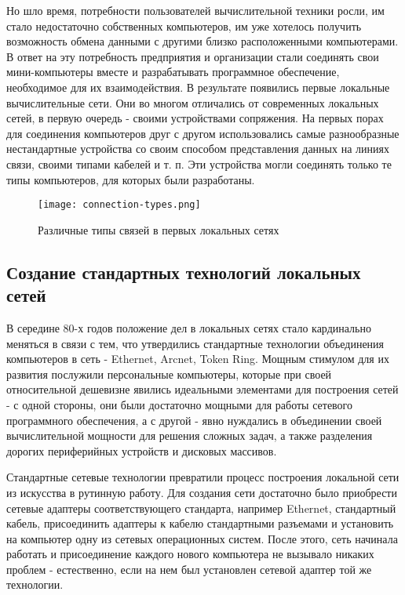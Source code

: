 Но шло время, потребности пользователей вычислительной техники росли, им стало недостаточно собственных компьютеров, им уже хотелось получить возможность обмена данными с другими близко расположенными компьютерами.
В ответ на эту потребность предприятия и организации стали соединять свои мини-компьютеры вместе и разрабатывать программное обеспечение, необходимое для их взаимодействия.
В результате появились первые локальные вычислительные сети.
Они во многом отличались от современных локальных сетей, в первую очередь - своими устройствами сопряжения.
На первых порах для соединения компьютеров друг с другом использовались самые разнообразные нестандартные устройства со своим способом представления данных на линиях связи, своими типами кабелей и т. п.
Эти устройства могли соединять только те типы компьютеров, для которых были разработаны.

\begin{figure}[!ht]
    \centering
    \texttt{[image: connection-types.png]}
    \caption{Различные типы связей в первых локальных сетях}
    \label{fig:connection-types}
\end{figure}

\subsection{Создание стандартных технологий локальных сетей}

В середине 80-х годов положение дел в локальных сетях стало кардинально меняться в связи с тем, что утвердились стандартные технологии объединения компьютеров в сеть - Ethernet, Arcnet, Token Ring.
Мощным стимулом для их развития послужили персональные компьютеры, которые при своей относительной дешевизне явились идеальными элементами для построения сетей - с одной стороны, они были достаточно мощными для работы сетевого программного обеспечения, а с другой - явно нуждались в объединении своей вычислительной мощности для решения сложных задач, а также разделения дорогих периферийных устройств и дисковых массивов.

Стандартные сетевые технологии превратили процесс построения локальной сети из искусства в рутинную работу.
Для создания сети достаточно было приобрести сетевые адаптеры соответствующего стандарта, например Ethernet, стандартный кабель, присоединить адаптеры к кабелю стандартными разъемами и установить на компьютер одну из сетевых операционных систем.
После этого, сеть начинала работать и присоединение каждого нового компьютера не вызывало никаких проблем - естественно, если на нем был установлен сетевой адаптер той же технологии.

